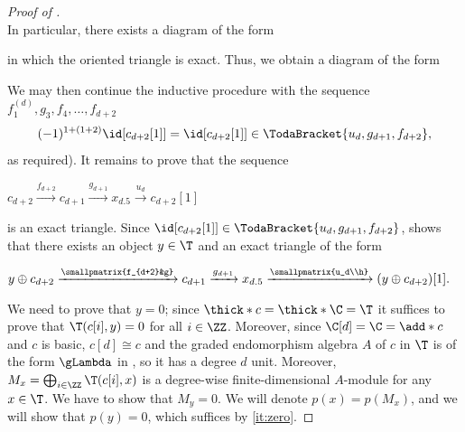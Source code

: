 \documentclass[a4paper]{amsart}
\begin{document}
\begin{proof}[Proof of ]
\[  \]
  In particular, there exists a diagram of the form
  \begin{center}
  \end{center}
  in which the oriented triangle is exact. Thus, we obtain a diagram of the form
  \begin{center}
  \end{center}
  We may then continue the inductive procedure with the sequence
  $f_1^{(d)},g_3,f_4,\dots,f_{d+2}$ 
  \[
    (-1)^{1+(1+2)}\id[c_{d+2}[1]]=\id[c_{d+2}[1]]\in\TodaBracket{u_d,g_{d+1},f_{d+2}},
  \]
  as required). It remains to prove that the sequence
  \begin{center}
    $c_{d+2}\xrightarrow{f_{d+2}}c_{d+1}\xrightarrow{g_{d+1}}x_{d.5}\xrightarrow{u_d}
    c_{d+2}[1]$
  \end{center}
  is an exact triangle. Since $\id[c_{d+2}[1]]\in\TodaBracket{u_d,g_{d+1},f_{d+2}}$,
   shows that there exists an object $y\in\T$ and an
  exact triangle of the form
  \begin{center}
    $y\oplus c_{d+2}\xrightarrow{\smallpmatrix{f_{d+2}&g}}c_{d+1}\xrightarrow{g_{d+1}}x_{d.5}\xrightarrow{\smallpmatrix{u_d\\h}}
    (y\oplus c_{d+2})[1].$
  \end{center}
  We need to prove that $y=0$; since $\thick*{c}=\thick*{\C}=\T$ it suffices
  to prove that $\T(c[i],y)=0$ for all $i\in\ZZ$. Moreover, since $\C[d]=\C=\add*{c}$ and $c$ is basic, $c[d]\cong c$ and the graded endomorphism algebra $A$ of $c$ in $\T$ is of the form $\gLambda$ in , so it has a degree $d$ unit. Moreover, $M_x=\bigoplus_{i\in\ZZ}\T(c[i],x)$ is a degree-wise finite-dimensional $A$-module for any $x\in \T$. We have to show that $M_y=0$. We will denote $p(x)=p(M_x)$, and we will show that $p(y)=0$, which suffices by  \eqref{it:zero}.


\end{proof}
\end{document}
